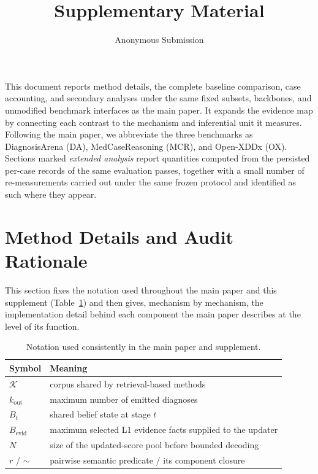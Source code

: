 \documentclass[letterpaper]{article}
\title{Supplementary Material}
\author{Anonymous Submission}
\begin{document}
\maketitle

This document reports method details, the complete baseline comparison, case accounting, and secondary analyses under the same fixed subsets, backbones, and unmodified benchmark interfaces as the main paper.
It expands the evidence map by connecting each contrast to the mechanism and inferential unit it measures.
Following the main paper, we abbreviate the three benchmarks as DiagnosisArena (DA), MedCaseReasoning (MCR), and Open-XDDx (OX).
Sections marked \emph{extended analysis} report quantities computed from the persisted per-case records of the same evaluation passes, together with a small number of re-measurements carried out under the same frozen protocol and identified as such where they appear.

\section{Method Details and Audit Rationale}

This section fixes the notation used throughout the main paper and this supplement (Table~\ref{tab:notation}) and then gives, mechanism by mechanism, the implementation detail behind each component the main paper describes at the level of its function.

\begin{table}[tb]
\centering
\small
\begin{tabular}{@{}lp{5.0cm}@{}}
\toprule
Symbol & Meaning \\
\midrule
$\mathcal{K}$ & corpus shared by retrieval-based methods \\
$k_{\mathrm{out}}$ & maximum number of emitted diagnoses \\
$B_t$ & shared belief state at stage $t$ \\
$B_{\mathrm{evid}}$ & maximum selected L1 evidence facts supplied to the updater \\
$N$ & size of the updated-score pool before bounded decoding \\
$r$ / $\sim$ & pairwise semantic predicate / its component closure \\
\bottomrule
\end{tabular}
\caption{Notation used consistently in the main paper and supplement.}
\label{tab:notation}
\end{table}
\end{document}
